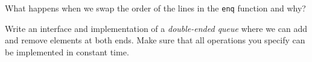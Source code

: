 \begin{exercise}
  What happens when we swap the order of the lines in the \lstinline'enq'
  function and why?
\end{exercise}

\begin{exercise}
  Write an interface and implementation of a \emph{double-ended queue}
  where we can add and remove elements at both ends.  Make sure that
  all operations you specify can be implemented in constant time.
\end{exercise}



\printsolutions
% 
% 











